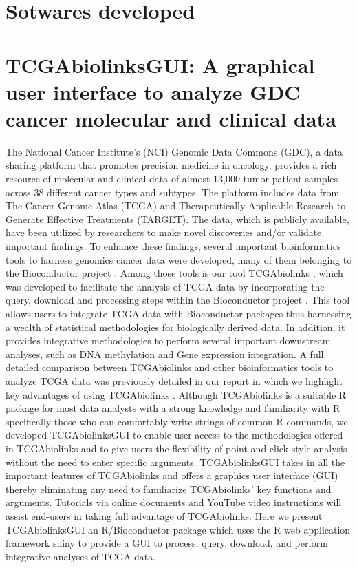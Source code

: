 
\section{Sotwares developed}







\section{TCGAbiolinksGUI: A graphical user interface to analyze GDC cancer molecular and clinical data}

The National Cancer Institute's (NCI) Genomic Data Commons (GDC), a data sharing platform that promotes precision medicine in oncology, provides a rich resource of molecular and clinical data of  almost 13,000 tumor patient samples across 38 different cancer types and subtypes. The platform includes data from The Cancer Genome Atlas (TCGA) and Therapeutically Applicable Research to Generate Effective Treatments (TARGET). The data, which is publicly available, have been utilized by researchers to make novel discoveries and/or validate important findings. To enhance these findings, several important bioinformatics tools to harness genomics cancer data were developed, many of them belonging to the Bioconductor project \cite{gentleman2004bioconductor}. Among those tools is our tool TCGAbiolinks \cite{TCGAbiolinks}, which was developed to facilitate the analysis of TCGA data by incorporating the query, download and processing steps within the Bioconductor project \cite{gentleman2004bioconductor}. This tool allows users to integrate TCGA data with Bioconductor packages thus harnessing a wealth of statistical methodologies for biologically derived data. In addition, it provides integrative methodologies to perform several important downstream analyses, such as DNA methylation and Gene expression integration. A full detailed comparison between TCGAbiolinks and other bioinformatics tools to analyze TCGA data was previously detailed in our report in which we highlight key advantages of using TCGAbiolinks  \cite{TCGAbiolinks}. Although TCGAbiolinks is a suitable R package for most data analysts with a strong knowledge and familiarity with R specifically those who can comfortably write strings of common R commands, we developed TCGAbiolinksGUI to enable user access to the methodologies offered in TCGAbiolinks and to give users the flexibility of point-and-click style analysis without the need to enter specific arguments. TCGAbiolinksGUI takes in all the important features of TCGAbiolinks and offers a graphics user interface (GUI) thereby eliminating any need to familiarize TCGAbiolinks' key functions and arguments.  Tutorials via online documents and YouTube video instructions will assist end-users in taking full advantage of TCGAbiolinks.
Here we present TCGAbiolinksGUI an R/Bioconductor package which uses the R web application framework shiny \cite{shiny} to provide a GUI to process, query, download, and perform integrative analyses of TCGA data.

